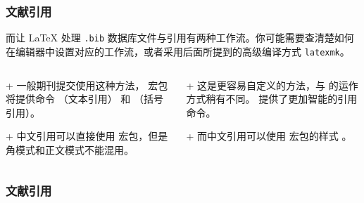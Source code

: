 \begin{shadedsection}
\begin{frame}
  \frametitle{文献引用}
  而让 \LaTeX{} 处理 \texttt{.bib} 数据库文件与引用有两种工作流。你可能需要查清楚如何在编辑器中设置对应的工作流，或者采用后面所提到的高级编译方式 \texttt{latexmk}。
  \begin{columns}
    \begin{column}{0.5\textwidth}
      \begin{block}{ + }
        一般期刊提交使用这种方法， 宏包将提供命令 （文本引用） 和 （括号引用）。
      \end{block}
      \begin{alertblock}{ + }
        中文引用可以直接使用  宏包，但是角模式和正文模式不能混用。
      \end{alertblock}
    \end{column}
    \begin{column}{0.5\textwidth}
      \begin{block}{ + }
        这是更容易自定义的方法，与  的运作方式稍有不同。 提供了更加智能的引用命令。
      \end{block}
      \begin{alertblock}{ + }
        而中文引用可以使用  宏包的样式 。
      \end{alertblock}
    \end{column}
  \end{columns}
\end{frame}

\begin{frame}[fragile]
  \frametitle{文献引用}
  \begin{columns}
    \begin{column}{0.5\textwidth}
    \end{column}
    \begin{column}{0.5\textwidth}
\end{column}
\end{columns}
\end{frame}
\end{shadedsection}
